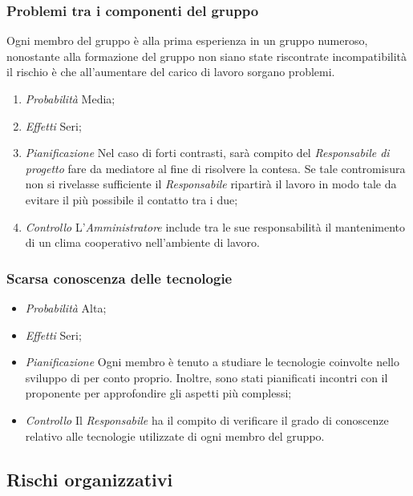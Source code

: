 		\subsubsection{Problemi tra i componenti del gruppo}

Ogni membro del gruppo è alla prima esperienza in un gruppo numeroso, nonostante alla formazione del gruppo non siano state riscontrate incompatibilità il rischio è che all'aumentare del carico di lavoro sorgano problemi.		
\begin{enumerate}
\item \textit{Probabilità} Media;
\item \textit{Effetti} Seri;
\item \textit{Pianificazione} Nel caso di forti contrasti, sarà compito del \textit{Responsabile di progetto} fare da mediatore al fine di risolvere la contesa. Se tale contromisura non si rivelasse sufficiente il \textit{Responsabile} ripartirà il lavoro in modo tale da evitare il più possibile il contatto tra i due;
\item \textit{Controllo} L'\textit{Amministratore} include tra le sue responsabilità il mantenimento di un clima cooperativo nell'ambiente di lavoro.
\end{enumerate}	
		
		\subsubsection{Scarsa conoscenza delle tecnologie}
		
\begin{itemize}
\item \textit{Probabilità} Alta;
\item \textit{Effetti} Seri;
\item \textit{Pianificazione} Ogni membro è tenuto a studiare le tecnologie coinvolte nello sviluppo di \ProjectName  per conto proprio. Inoltre, sono stati pianificati incontri con il proponente per approfondire gli aspetti più complessi;
\item \textit{Controllo}  Il \textit{Responsabile} ha il compito di verificare il grado di conoscenze relativo alle tecnologie utilizzate di ogni membro del gruppo.
\end{itemize}	


	\subsection{Rischi organizzativi}
	
